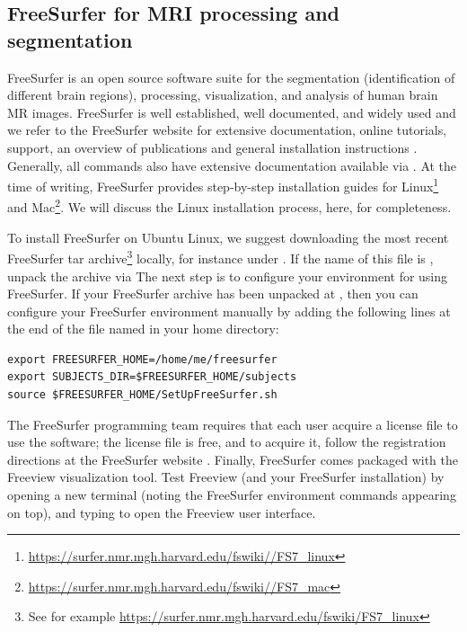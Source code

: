 \subsection{FreeSurfer for MRI processing and segmentation}
\label{sec:chp2:tools:freesurfer}

FreeSurfer \cite{dale1999cortical} is an open source software suite
for the segmentation (identification of different brain regions), processing,
visualization, and analysis of human brain MR images. FreeSurfer is
well established, well documented, and widely used and we refer to the
FreeSurfer website for extensive documentation, online tutorials,
support, an overview of publications and general installation
instructions \cite{freesurfer}. Generally, all \freesurfer{} commands
also have extensive documentation available via .  At the time of 
writing, FreeSurfer provides step-by-step installation guides for 
Linux\footnote{\url{https://surfer.nmr.mgh.harvard.edu/fswiki//FS7\_linux}}
and Mac\footnote{\url{https://surfer.nmr.mgh.harvard.edu/fswiki//FS7\_mac}}.  
We will discuss the Linux installation process, here, for completeness. 

To install FreeSurfer on Ubuntu Linux, we suggest downloading the most
recent FreeSurfer tar archive\footnote{See for example \url{https://surfer.nmr.mgh.harvard.edu/fswiki/FS7\_linux}}
locally, for instance under . If the name of this
file is , unpack the archive via
\noindent The next step is to configure your environment for using
FreeSurfer. If your FreeSurfer archive has been unpacked at
, then you can configure your FreeSurfer 
environment manually by adding the following lines
at the end of the file named  in your home
directory:
\begin{lstlisting}[style=bashStyle]
export FREESURFER_HOME=/home/me/freesurfer 
export SUBJECTS_DIR=$FREESURFER_HOME/subjects 
source $FREESURFER_HOME/SetUpFreeSurfer.sh
\end{lstlisting}
  


\noindent The {FreeSurfer} programming team requires that each user
acquire a license file to use the software; the license file is free,
and to acquire it, follow the registration directions at the FreeSurfer
website \cite{freesurfer}. Finally, FreeSurfer comes packaged
with the Freeview visualization tool. Test Freeview (and your
FreeSurfer installation) by opening a new terminal (noting the
FreeSurfer environment commands appearing on top), and typing
\noindent to open the Freeview user interface.

